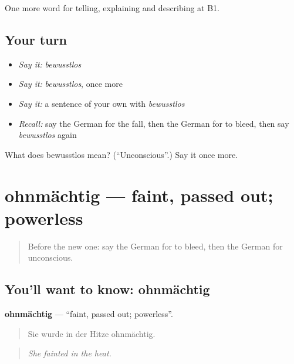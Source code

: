 \begin{grammarlens}[title={What you've built}]
One more word for telling, explaining and describing at B1.
\end{grammarlens}

\subsection*{Your turn}
\begin{itemize}
\raggedright
  \item \emph{Say it:} \emph{bewusstlos}
  \item \emph{Say it:} \emph{bewusstlos}, once more
  \item \emph{Say it:} a sentence of your own with \emph{bewusstlos}
  \item \emph{Recall:} say the German for the fall, then the German for to bleed, then say \emph{bewusstlos} again
\end{itemize}

\begin{tcolorbox}[breakable,colback=teal!4,colframe=teal!35!black,title={Before you move on}]
What does bewusstlos mean? (\textquotedblleft{}Unconscious\textquotedblright{}.) Say it once more.
\end{tcolorbox}
\section[ohnmächtig]{ohnmächtig — faint, passed out; powerless}

\label{lesson:GE-C290-ohnmaechtig}



\begin{quote}
Before the new one: say the German for to bleed, then the German for unconscious.
\end{quote}

\subsection*{You'll want to know: ohnmächtig}
\textbf{ohnmächtig} — \textquotedblleft{}faint, passed out; powerless\textquotedblright{}.

\begin{quote}
Sie wurde in der Hitze ohnmächtig.
\end{quote}

\begin{quote}
\emph{She fainted in the heat.}
\end{quote}

